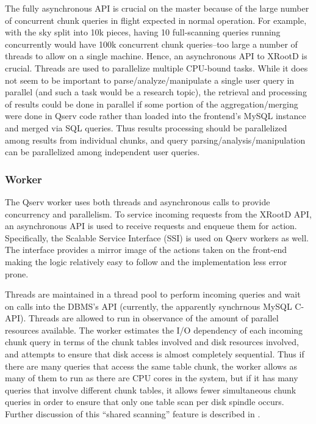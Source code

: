 \documentclass[DM,lsstdraft,toc]{lsstdoc}
\begin{document}
The fully asynchronous API is crucial on the master because of the large
number of concurrent chunk queries in flight expected in normal
operation. For example, with the sky split into 10k pieces, having 10
full-scanning queries running concurrently would have 100k concurrent
chunk queries--too large a number of threads to allow on a single
machine. Hence, an asynchronous API to XRootD
is crucial. Threads are used to parallelize multiple CPU-bound tasks.
While it does not seem to be important to parse/analyze/manipulate a
single user query in parallel (and such a task would be a research
topic), the retrieval and processing of results could be done in
parallel if some portion of the aggregation/merging were done in Qserv
code rather than loaded into the frontend's MySQL instance and merged
via SQL queries. Thus results processing should be parallelized among
results from individual chunks, and query parsing/analysis/manipulation
can be parallelized among independent user queries.

\subsubsection{Worker}\label{worker}

The Qserv worker uses both threads and asynchronous calls to provide
concurrency and parallelism. To service incoming requests from the
XRootD API, an asynchronous API is used to
receive requests and enqueue them for action. Specifically, the Scalable
Service Interface (SSI) is used on Qserv workers as well. The
interface provides a mirror image of the actions taken on the front-end
making the logic relatively easy to follow and the implementation less
error prone.

Threads are maintained in a thread pool to perform incoming queries and
wait on calls into the DBMS's API (currently, the apparently synchrnous
MySQL C-API). Threads are allowed to run in observance of the amount of
parallel resources available. The worker estimates the I/O dependency of
each incoming chunk query in terms of the chunk tables involved and disk
resources involved, and attempts to ensure that disk access is almost
completely sequential. Thus if there are many queries that access the
same table chunk, the worker allows as many of them to run as there are
CPU cores in the system, but if it has many queries that involve
different chunk tables, it allows fewer simultaneous chunk queries in
order to ensure that only one table scan per disk spindle occurs.
Further discussion of this ``shared scanning'' feature is described in
.
\end{document}
